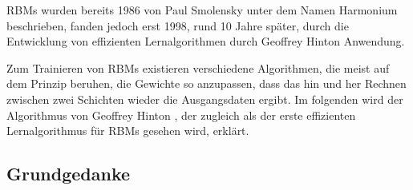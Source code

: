 RBMs wurden bereits 1986 von Paul Smolensky \citep{rbm} unter dem Namen Harmonium beschrieben, fanden jedoch erst 1998, rund 10 Jahre später, durch die Entwicklung von effizienten Lernalgorithmen durch Geoffrey Hinton Anwendung.

Zum Trainieren von RBMs existieren verschiedene Algorithmen, die meist auf dem Prinzip beruhen, die Gewichte so anzupassen, dass das hin und her Rechnen zwischen zwei Schichten wieder die Ausgangsdaten ergibt. Im folgenden wird der Algorithmus von Geoffrey Hinton \citep{BackpropagationFast}, der zugleich als der erste effizienten Lernalgorithmus für RBMs gesehen wird, erklärt.

\subsection{Grundgedanke}

